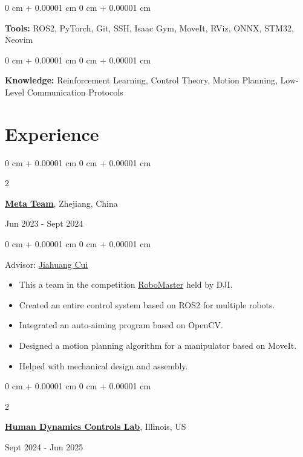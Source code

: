 \documentclass[10pt, letterpaper]{article}
\newenvironment{highlights}{
    \begin{itemize}[
        topsep=0.10 cm,
        parsep=0.10 cm,
        partopsep=0pt,
        itemsep=0pt,
        leftmargin=0 cm + 10pt
    ]
}{
    \end{itemize}
} %
\newenvironment{onecolentry}{
    \begin{adjustwidth}{
        0 cm + 0.00001 cm
    }{
        0 cm + 0.00001 cm
    }
}{
    \end{adjustwidth}
} %
\newenvironment{twocolentry}[2][]{
    \onecolentry
    \def\secondColumn{#2}
    \setcolumnwidth{\fill, 4.5 cm}
    \begin{paracol}{2}
}{
    \switchcolumn \raggedleft \secondColumn
    \end{paracol}
    \endonecolentry
} %
\begin{document}
        \begin{onecolentry}
            \textbf{Tools:} ROS2, PyTorch, Git, SSH, Isaac Gym, MoveIt, RViz, ONNX, STM32, Neovim \end{onecolentry}

        \vspace{0.2 cm}

        \begin{onecolentry}
            \textbf{Knowledge:} Reinforcement Learning, Control Theory, Motion Planning, Low-Level Communication Protocols \end{onecolentry}
    
    \section{Experience}



        
        \begin{twocolentry}{
            Jun 2023 - Sept 2024
        }
            \href{https://github.com/Meta-Team/Meta-ROS}{\textbf{Meta Team}}, Zhejiang, China
        
        \end{twocolentry}

        \vspace{0.10 cm}
        \begin{onecolentry}
            Advisor: \href{https://mechse.illinois.edu/people/profile/zjui-cui}{Jiahuang Cui}
            \begin{highlights}
                \item This a team in the competition \href{https://www.robomaster.com/en-US}{RoboMaster} held by DJI.
                \item Created an entire control system based on ROS2 for multiple robots.
                \item Integrated an auto-aiming program based on OpenCV.
                \item Designed a motion planning algorithm for a manipulator based on MoveIt.
                \item Helped with mechanical design and assembly.
            \end{highlights}
        \end{onecolentry}

        \vspace{0.2 cm}

        \begin{twocolentry} {
            Sept 2024 - Jun 2025
        }
            \href{https://hdcl.mechanical.illinois.edu}{\textbf{Human Dynamics Controls Lab}}, Illinois, US
        \end{twocolentry}
\end{document}
